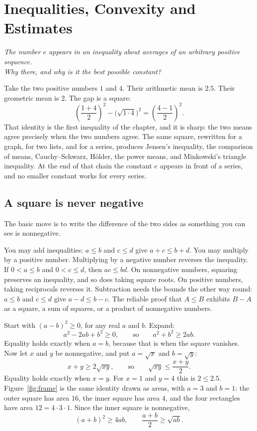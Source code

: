 \chapter{Inequalities, Convexity and Estimates}\label{ch:inequalities}

\begin{center}\itshape
The number $e$ appears in an inequality about averages of an arbitrary positive sequence.\\
Why there, and why is it the best possible constant?
\end{center}

Take the two positive numbers $1$ and $4$. Their arithmetic mean is $2.5$. Their geometric mean is $2$. The gap is a square:
\[
\left(\frac{1+4}2\right)^2-\bigl(\sqrt{1\cdot4}\bigr)^2=\left(\frac{4-1}2\right)^2.
\]
That identity is the first inequality of the chapter, and it is sharp: the two means agree precisely when the two numbers agree. The same square, rewritten for a graph, for two lists, and for a series, produces Jensen's inequality, the comparison of means, Cauchy--Schwarz, H\"older, the power means, and Minkowski's triangle inequality. At the end of that chain the constant $e$ appears in front of a series, and no smaller constant works for every series.

\section{A square is never negative}\label{sec:squares}

The basic move is to write the difference of the two sides as something you can see is nonnegative.

\begin{reminder}
You may add inequalities: $a\le b$ and $c\le d$ give $a+c\le b+d$. You may multiply by a positive number. Multiplying by a negative number reverses the inequality. If $0<a\le b$ and $0<c\le d$, then $ac\le bd$. On nonnegative numbers, squaring preserves an inequality, and so does taking square roots. On positive numbers, taking reciprocals reverses it. Subtraction needs the bounds the other way round: $a\le b$ and $c\le d$ give $a-d\le b-c$. The reliable proof that $A\le B$ exhibits $B-A$ as a square, a sum of squares, or a product of nonnegative numbers.
\end{reminder}

Start with $(a-b)^2\ge0$, for any real $a$ and $b$. Expand:
\[
a^2-2ab+b^2\ge0,\qquad\text{so}\qquad a^2+b^2\ge2ab.
\]
Equality holds exactly when $a=b$, because that is when the square vanishes. Now let $x$ and $y$ be nonnegative, and put $a=\sqrt x$ and $b=\sqrt y$:
\[
x+y\ge2\sqrt{xy},\qquad\text{so}\qquad\sqrt{xy}\le\frac{x+y}2.
\]
Equality holds exactly when $x=y$. For $x=1$ and $y=4$ this is $2\le2.5$. Figure~\ref{fig:frame} is the same identity drawn as areas, with $a=3$ and $b=1$: the outer square has area $16$, the inner square has area $4$, and the four rectangles have area $12=4\cdot3\cdot1$. Since the inner square is nonnegative,
\[
(a+b)^2\ge4ab,\qquad\frac{a+b}2\ge\sqrt{ab}.
\]


